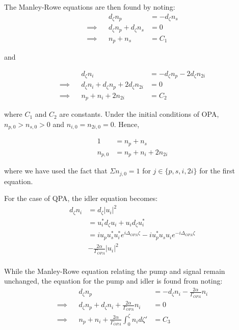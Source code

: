 \documentclass[%
 reprint,
 amsmath,amssymb,
 aps,
floatfix,
]{revtex4-2}
\begin{document}
\noindent The Manley-Rowe equations are then found by noting:
\begin{align*}
    && d_{\zeta}n_p &= -d_{\zeta}n_s\\
    \implies && d_{\zeta}n_p + d_{\zeta}n_s &= 0\\
    \implies && n_p + n_s &= C_1
\end{align*}

\noindent and

\begin{align*}
    && d_{\zeta}n_i &= -d_{\zeta}n_p - 2d_{\zeta}n_{2i}\\
    \implies && d_{\zeta}n_i + d_{\zeta}n_p + 2d_{\zeta}n_{2i} &= 0\\
    \implies && n_p + n_i + 2n_{2i} &= C_2
\end{align*}

\noindent where $C_1$ and $C_2$ are constants. Under the initial conditions of OPA, $n_{p,0}>n_{s,0}>0$ and $n_{i,0}=n_{2i,0}=0$. Hence,

\begin{align*}
    1 &= n_p + n_s\\
    n_{p,0} &= n_p + n_i + 2n_{2i}
\end{align*}

\noindent where we have used the fact that $\Sigma n_{j,0} = 1$ for $j \in \{p, s, i, 2i \}$ for the first equation.

For the case of QPA, the idler equation becomes:
\begin{align*}
    d_{\zeta}n_i & = d_{\zeta}|u_i|^2\\
                 & = u_i^* d_{\zeta}u_i + u_i d_{\zeta}u_i^*\\
                 & = i u_p u_s^* u_i^* e^{i\Delta_{OPA}\zeta} - i u_p^* u_s u_i e^{-i\Delta_{OPA}\zeta}\\ 
                 & -\frac{2\alpha}{\Gamma_{OPA}} |u_i|^2\\
\end{align*}

\noindent While the Manley-Rowe equation relating the pump and signal remain unchanged, the equation for the pump and idler is found from noting:
\begin{align*}
    && d_{\zeta}n_p &= -d_{\zeta}n_i - \frac{2\alpha}{\Gamma_{OPA}} n_i\\
    \implies && d_{\zeta}n_p + d_{\zeta}n_i + \frac{2\alpha}{\Gamma_{OPA}} n_i &= 0\\
    \implies && n_p + n_i + \frac{2\alpha}{\Gamma_{OPA}}\int^\zeta_0 n_{i} d\zeta' &= C_3
\end{align*}
\end{document}
